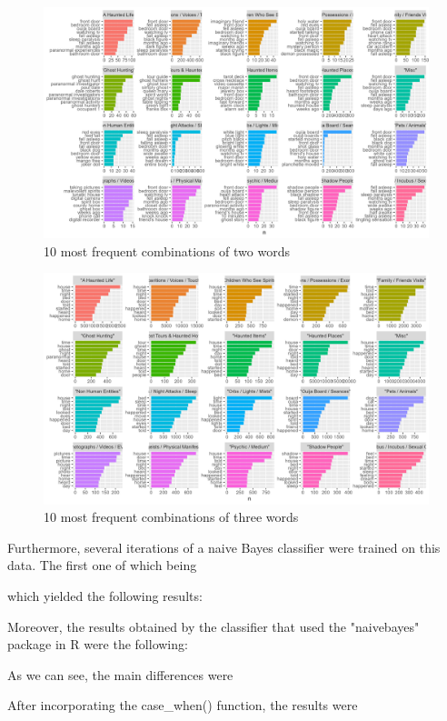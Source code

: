 \documentclass[twocolumn]{article}
\begin{document}
\begin{figure}[htbp]
    \centering
    \includegraphics[width=1\columnwidth]{figures/bigrams.png}
    \caption{10 most frequent combinations of two words}
    \label{unigrams}
\end{figure}

\begin{figure}[htbp]
    \centering
    \includegraphics[width=0.8\columnwidth]{figures/unigrams.png}
    \caption{10 most frequent combinations of three words}
    \label{unigrams}
\end{figure}

Furthermore, several iterations of a naive Bayes classifier were trained on this data. The first one of which being  




which yielded the following results:


Moreover, the results obtained by the classifier that used the "naivebayes" package in R were the following:


As we can see, the main differences were 



After incorporating the case\_when() function, the results were
\end{document}
